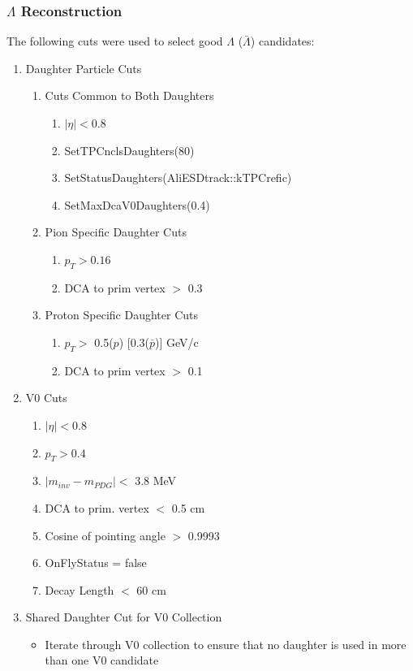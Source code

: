 \documentclass[../AnalysisNoteJBuxton.tex]{subfiles}
\begin{document}
\subsubsection{\texorpdfstring{$\Lambda$}{TEXT} Reconstruction}
\label{LambdaReconstruction}

The following cuts were used to select good $\Lambda$ ($\bar{\Lambda}$) candidates:

\begin{enumerate}
 \item Daughter Particle Cuts
 \begin{enumerate}
  \item{Cuts Common to Both Daughters}
  \begin{enumerate}
   \item $|\eta| < 0.8$
   \item SetTPCnclsDaughters(80)
   \item SetStatusDaughters(AliESDtrack::kTPCrefic)
   \item SetMaxDcaV0Daughters(0.4)
  \end{enumerate}
  \item Pion Specific Daughter Cuts 
  \begin{enumerate}
   \item $p_{T} > 0.16$
   \item DCA to prim vertex $>$ 0.3
  \end{enumerate}
  \item Proton Specific Daughter Cuts
  \begin{enumerate}
   \item $p_{T} > $ 0.5($p$) [0.3($\bar{p}$)] GeV/c
   \item DCA to prim vertex $>$ 0.1 
  \end{enumerate}
 \end{enumerate}
 \item V0 Cuts
 \begin{enumerate}
  \item $|\eta| < 0.8$
  \item $p_{T} > 0.4$
  \item $|m_{inv} - m_{PDG}| <$ 3.8 MeV
  \item DCA to prim. vertex $<$ 0.5 cm
  \item Cosine of pointing angle $>$ 0.9993
  \item OnFlyStatus = false
  \item Decay Length $<$ 60 cm
 \end{enumerate}
 \item Shared Daughter Cut for V0 Collection
 \begin{itemize}
  \item Iterate through V0 collection to ensure that no daughter is used in more than one V0 candidate
 \end{itemize}
\end{enumerate} 
\end{document}
